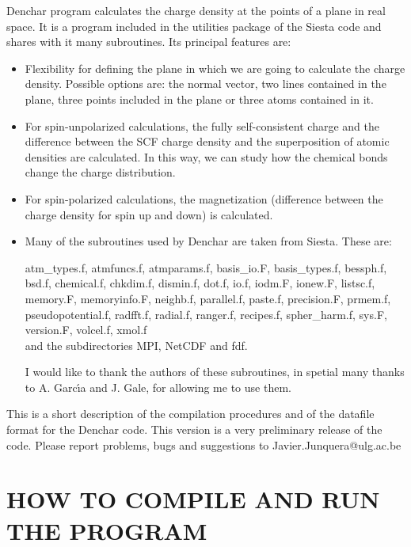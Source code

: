 {\sc Denchar} program calculates the charge density at the points of a plane
in real space. It is a program included in the utilities package of the
{\sc Siesta} code and shares with it many subroutines. Its principal 
features are:

\begin{itemize}

\item
Flexibility for defining the plane in which we are going to calculate
the charge density. Possible options are: the normal vector, 
two lines contained in the plane,
three points included in the plane or three atoms contained in it.

\item
For spin-unpolarized calculations, the fully self-consistent charge and
the difference between the SCF charge density and the superposition of atomic
densities are calculated. In this way, we can study how the chemical bonds 
change the charge distribution.
 
\item
For spin-polarized calculations, the magnetization (difference between
the charge density for spin up and down) is calculated.

\item 
Many of the subroutines used by {\sc Denchar} 
are taken from {\sc Siesta}. These are:

atm\_types.f, atmfuncs.f, atmparams.f, basis\_io.F, basis\_types.f, 
bessph.f, bsd.f, chemical.f, chkdim.f, dismin.f, dot.f, io.f, iodm.F, 
ionew.F, listsc.f, memory.F, memoryinfo.F, neighb.f, 
parallel.f, paste.f, precision.F, prmem.f, pseudopotential.f,
radfft.f, radial.f, ranger.f, recipes.f, spher\_harm.f, sys.F, 
version.F, volcel.f, xmol.f \\
 
and the subdirectories MPI, NetCDF and fdf.
 
I would like to thank the authors of these subroutines,
in spetial many thanks to A. Garc\'{\i}a and
J. Gale,  for allowing me 
to use them.

\end{itemize}

This is a short description of the compilation procedures
and of the datafile format for the {\sc Denchar} code.
This version is a very preliminary release of the code.
Please report problems, bugs and suggestions to
Javier.Junquera@ulg.ac.be

\section{HOW TO COMPILE AND RUN THE PROGRAM}

